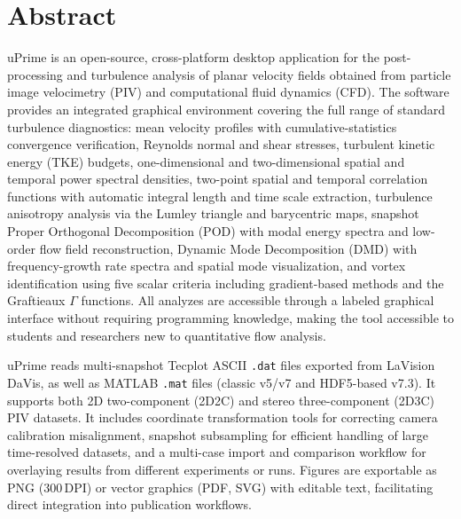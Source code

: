 \documentclass[11pt, a4paper]{report}
\newcommand{\software}[1]{\textsf{#1}}
\begin{document}
\begin{titlepage}
\vspace{0.4cm}
\noindent\colorbox{upblue}{\rule{0pt}{5pt}\hspace{\dimexpr\textwidth+2\fboxsep\relax}}
\end{titlepage}

\clearpage
\thispagestyle{empty}

\section*{Abstract}

\software{uPrime} is an open-source, cross-platform desktop application for the post-processing and turbulence analysis of planar velocity fields obtained from particle image velocimetry (PIV) and computational fluid dynamics (CFD). The software provides an integrated graphical environment covering the full range of standard turbulence diagnostics: mean velocity profiles with cumulative-statistics convergence verification, Reynolds normal and shear stresses, turbulent kinetic energy (TKE) budgets, one-dimensional and two-dimensional spatial and temporal power spectral densities, two-point spatial and temporal correlation functions with automatic integral length and time scale extraction, turbulence anisotropy analysis via the Lumley triangle and barycentric maps, snapshot Proper Orthogonal Decomposition (POD) with modal energy spectra and low-order flow field reconstruction, Dynamic Mode Decomposition (DMD) with frequency-growth rate spectra and spatial mode visualization, and vortex identification using five scalar criteria including gradient-based methods and the Graftieaux $\Gamma$ functions. All analyzes are accessible through a labeled graphical interface without requiring programming knowledge, making the tool accessible to students and researchers new to quantitative flow analysis.

\software{uPrime} reads multi-snapshot Tecplot ASCII \texttt{.dat} files exported from LaVision DaVis, as well as MATLAB \texttt{.mat} files (classic v5/v7 and HDF5-based v7.3). It supports both 2D two-component (2D2C) and stereo three-component (2D3C) PIV datasets. It includes coordinate transformation tools for correcting camera calibration misalignment, snapshot subsampling for efficient handling of large time-resolved datasets, and a multi-case import and comparison workflow for overlaying results from different experiments or runs. Figures are exportable as PNG (300\,DPI) or vector graphics (PDF, SVG) with editable text, facilitating direct integration into publication workflows.
\end{document}
